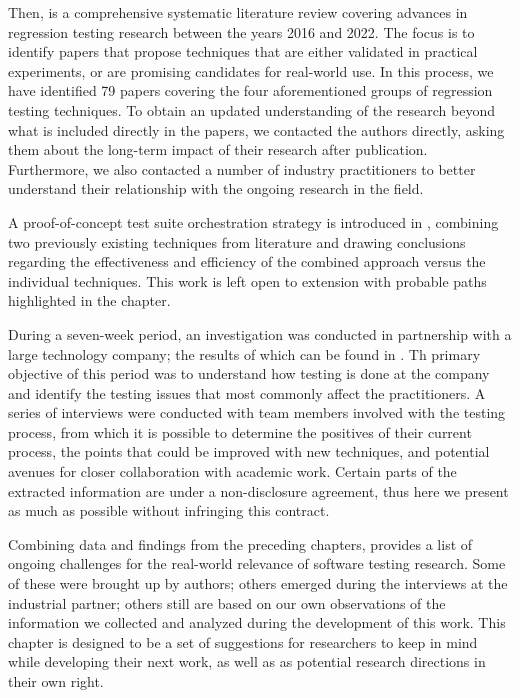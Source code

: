Then,  is a comprehensive systematic literature review covering advances in regression testing research between the years 2016 and 2022.
The focus is to identify papers that propose techniques that are either validated in practical experiments, or are promising candidates for real-world use.
In this process, we have identified 79 papers covering the four aforementioned groups of regression testing techniques.
To obtain an updated understanding of the research beyond what is included directly in the papers, we contacted the authors directly, asking them about the long-term impact of their research after publication.
Furthermore, we also contacted a number of industry practitioners to better understand their relationship with the ongoing research in the field.

A proof-of-concept test suite orchestration strategy is introduced in , combining two previously existing techniques from literature and drawing conclusions regarding the effectiveness and efficiency of the combined approach versus the individual techniques.
This work is left open to extension with probable paths highlighted in the chapter.

During a seven-week period, an investigation was conducted in partnership with a large technology company; the results of which can be found in .
Th primary objective of this period was to understand how testing is done at the company and identify the testing issues that most commonly affect the practitioners.
A series of interviews were conducted with team members involved with the testing process, from which it is possible to determine the positives of their current process, the points that could be improved with new techniques, and potential avenues for closer collaboration with academic work.
Certain parts of the extracted information are under a non-disclosure agreement, thus here we present as much as possible without infringing this contract.

Combining data and findings from the preceding chapters,  provides a list of ongoing challenges for the real-world relevance of software testing research.
Some of these were brought up by authors; others emerged during the interviews at the industrial partner; others still are based on our own observations of the information we collected and analyzed during the development of this work.
This chapter is designed to be a set of suggestions for researchers to keep in mind while developing their next work, as well as as potential research directions in their own right.

